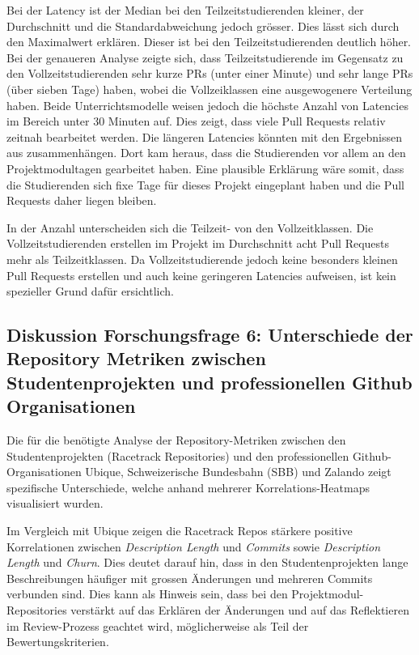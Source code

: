 Bei der Latency ist der Median bei den Teilzeitstudierenden kleiner, der Durchschnitt und die Standardabweichung jedoch grösser. Dies lässt sich durch den Maximalwert erklären. Dieser ist bei den Teilzeitstudierenden deutlich höher. Bei der genaueren Analyse zeigte sich, dass Teilzeitstudierende im Gegensatz zu den Vollzeitstudierenden sehr kurze PRs (unter einer Minute) und sehr lange PRs (über sieben Tage) haben, wobei die Vollzeiklassen eine ausgewogenere Verteilung haben. Beide Unterrichtsmodelle weisen jedoch die höchste Anzahl von Latencies im Bereich unter 30 Minuten auf. Dies zeigt, dass viele Pull Requests relativ zeitnah bearbeitet werden. Die längeren Latencies könnten mit den Ergebnissen aus  zusammenhängen. Dort kam heraus, dass die Studierenden vor allem an den Projektmodultagen gearbeitet haben. Eine plausible Erklärung wäre somit, dass die Studierenden sich fixe Tage für dieses Projekt eingeplant haben und die Pull Requests daher liegen bleiben.

In der Anzahl unterscheiden sich die Teilzeit- von den Vollzeitklassen. Die Vollzeitstudierenden erstellen im Projekt im Durchschnitt acht Pull Requests mehr als Teilzeitklassen. Da Vollzeitstudierende jedoch keine besonders kleinen Pull Requests erstellen und auch keine geringeren Latencies aufweisen, ist kein spezieller Grund dafür ersichtlich.

\subsection{Diskussion Forschungsfrage 6: Unterschiede der Repository Metriken zwischen Studentenprojekten und professionellen Github Organisationen}
Die für die  benötigte Analyse der Repository-Metriken zwischen den Studentenprojekten (Racetrack Repositories) und den professionellen Github-Organisationen Ubique, Schweizerische Bundesbahn (SBB) und Zalando zeigt spezifische Unterschiede, welche anhand mehrerer Korrelations-Heatmaps visualisiert wurden. 

Im Vergleich mit Ubique zeigen die Racetrack Repos stärkere positive Korrelationen zwischen \textit{Description Length} und \textit{Commits} sowie \textit{Description Length} und \textit{Churn}. Dies deutet darauf hin, dass in den Studentenprojekten lange Beschreibungen häufiger mit grossen Änderungen und mehreren Commits verbunden sind. Dies kann als Hinweis sein, dass bei den Projektmodul-Repositories verstärkt auf das Erklären der Änderungen und auf das Reflektieren im Review-Prozess geachtet wird, möglicherweise als Teil der Bewertungskriterien. 

